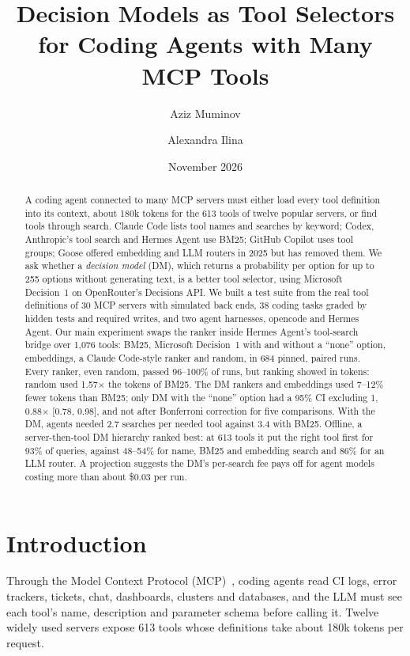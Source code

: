 \documentclass[11pt]{article}
\title{\textbf{Decision Models as Tool Selectors for Coding Agents with Many MCP Tools}}
\author{Aziz Muminov \and Alexandra Ilina}
\date{November 2026}
\begin{document}
\maketitle

\begin{abstract}
A coding agent connected to many MCP servers must either load every tool definition into its context, about 180k
tokens for the 613 tools of twelve popular servers, or find tools through search. Claude Code lists tool names and
searches by keyword; Codex, Anthropic's tool search and Hermes Agent use BM25; GitHub Copilot uses tool groups;
Goose offered embedding and LLM routers in 2025 but has removed them. We ask whether a \emph{decision model} (DM),
which returns a probability per option for up to 255 options without generating text, is a better tool selector,
using Microsoft Decision~1 on OpenRouter's Decisions API. We built a test suite from the real tool definitions of
30 MCP servers with simulated back ends, 38 coding tasks graded by hidden tests and required writes, and two agent
harnesses, opencode and Hermes Agent. Our main experiment swaps the ranker inside Hermes Agent's tool-search bridge
over 1{,}076 tools: BM25, Microsoft Decision~1 with and without a ``none'' option, embeddings, a Claude Code-style
ranker and random, in 684 pinned, paired runs. Every ranker, even random, passed 96--100\% of runs, but ranking
showed in tokens: random used 1.57$\times$ the tokens of BM25. The DM rankers and embeddings used 7--12\% fewer
tokens than BM25; only DM with the ``none'' option had a 95\% CI excluding 1, 0.88$\times$ [0.78, 0.98], and not
after Bonferroni correction for five comparisons. With the DM, agents needed 2.7 searches per needed tool against
3.4 with BM25. Offline, a server-then-tool DM hierarchy ranked best: at 613 tools it put the right tool first for
93\% of queries, against 48--54\% for name, BM25 and embedding search and 86\% for an LLM router. A projection
suggests the DM's per-search fee pays off for agent models costing more than about \$0.03 per run.
\end{abstract}

\section{Introduction}\label{sec:intro}
Through the Model Context Protocol (MCP)~\citep{mcp}, coding agents read CI logs, error trackers, tickets, chat,
dashboards, clusters and databases, and the LLM must see each tool's name, description and parameter schema
before calling it. Twelve widely used servers expose 613 tools whose definitions take about 180k tokens per
request.
\end{document}
